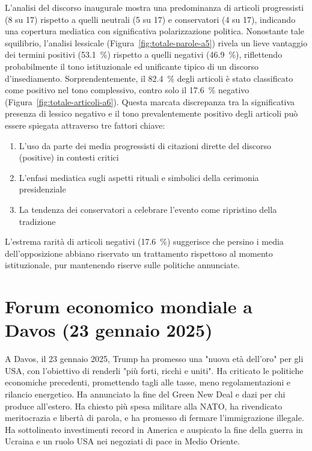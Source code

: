 L'analisi del discorso inaugurale mostra una predominanza di articoli progressisti (8 su 17) rispetto a quelli neutrali (5 su 17) e conservatori (4 su 17), indicando una copertura mediatica con significativa polarizzazione politica. Nonostante tale squilibrio, l'analisi lessicale (Figura~\ref{fig:totale-parole-a5}) rivela un lieve vantaggio dei termini positivi (\SI{53.1}{\percent}) rispetto a quelli negativi (\SI{46.9}{\percent}), riflettendo probabilmente il tono istituzionale ed unificante tipico di un discorso d'insediamento. Sorprendentemente, il \SI{82.4}{\percent} degli articoli è stato classificato come positivo nel tono complessivo, contro solo il \SI{17.6}{\percent} negativo (Figura~\ref{fig:totale-articoli-a6}). Questa marcata discrepanza tra la significativa presenza di lessico negativo e il tono prevalentemente positivo degli articoli può essere spiegata attraverso tre fattori chiave: 
\begin{enumerate}
    \item L'uso da parte dei media progressisti di citazioni dirette del discorso (positive) in contesti critici
    \item L'enfasi mediatica sugli aspetti rituali e simbolici della cerimonia presidenziale
    \item La tendenza dei conservatori a celebrare l'evento come ripristino della tradizione
\end{enumerate}
L'estrema rarità di articoli negativi (\SI{17.6}{\percent}) suggerisce che persino i media dell'opposizione abbiano riservato un trattamento rispettoso al momento istituzionale, pur mantenendo riserve sulle politiche annunciate.

\newpage
\section{Forum economico mondiale a Davos (23 gennaio 2025)}

A Davos, il 23 gennaio 2025, Trump ha promesso una "nuova età dell'oro" per gli USA, con l'obiettivo di renderli "più forti, ricchi e uniti".
Ha criticato le politiche economiche precedenti, promettendo tagli alle tasse, meno regolamentazioni e rilancio energetico.
Ha annunciato la fine del Green New Deal e dazi per chi produce all'estero.
Ha chiesto più spesa militare alla NATO, ha rivendicato meritocrazia e libertà di parola, e ha promesso di fermare l'immigrazione illegale.
Ha sottolineato investimenti record in America e auspicato la fine della guerra in Ucraina e un ruolo USA nei negoziati di pace in Medio Oriente. \\

